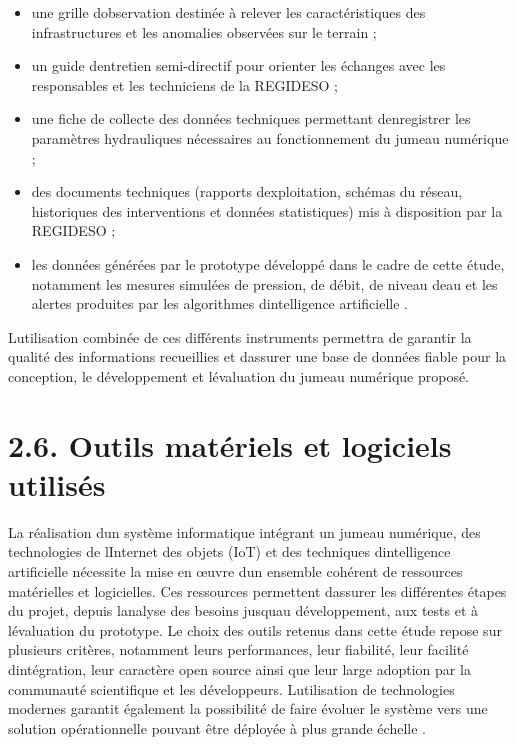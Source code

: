 \documentclass[12pt,a4paper,oneside]{report}
\begin{document}
\begin{itemize}
\item
  une grille d\textquotesingle observation destinée à relever les
  caractéristiques des infrastructures et les anomalies observées sur le
  terrain ;
\item
  un guide d\textquotesingle entretien semi-directif pour orienter les
  échanges avec les responsables et les techniciens de la REGIDESO ;
\item
  une fiche de collecte des données techniques permettant
  d\textquotesingle enregistrer les paramètres hydrauliques nécessaires
  au fonctionnement du jumeau numérique ;
\item
  des documents techniques (rapports d\textquotesingle exploitation,
  schémas du réseau, historiques des interventions et données
  statistiques) mis à disposition par la REGIDESO ;
\item
  les données générées par le prototype développé dans le cadre de cette
  étude, notamment les mesures simulées de pression, de débit, de niveau
  d\textquotesingle eau et les alertes produites par les algorithmes
  d\textquotesingle intelligence artificielle \cite{ref107}.
\end{itemize}

L\textquotesingle utilisation combinée de ces différents instruments
permettra de garantir la qualité des informations recueillies et
d\textquotesingle assurer une base de données fiable pour la conception,
le développement et l\textquotesingle évaluation du jumeau numérique
proposé.

\section{\texorpdfstring{\textbf{2.6. Outils matériels et logiciels
utilisés}}{2.6. Outils matériels et logiciels utilisés}}\label{outils-matuxe9riels-et-logiciels-utilisuxe9s}

La réalisation d\textquotesingle un système informatique intégrant un
jumeau numérique, des technologies de l\textquotesingle Internet des
objets (IoT) et des techniques d\textquotesingle intelligence
artificielle nécessite la mise en œuvre d\textquotesingle un ensemble
cohérent de ressources matérielles et logicielles. Ces ressources
permettent d\textquotesingle assurer les différentes étapes du projet,
depuis l\textquotesingle analyse des besoins jusqu\textquotesingle au
développement, aux tests et à l\textquotesingle évaluation du prototype.
Le choix des outils retenus dans cette étude repose sur plusieurs
critères, notamment leurs performances, leur fiabilité, leur facilité
d\textquotesingle intégration, leur caractère open source ainsi que leur
large adoption par la communauté scientifique et les développeurs.
L\textquotesingle utilisation de technologies modernes garantit
également la possibilité de faire évoluer le système vers une solution
opérationnelle pouvant être déployée à plus grande échelle \cite{ref106}.
\end{document}
